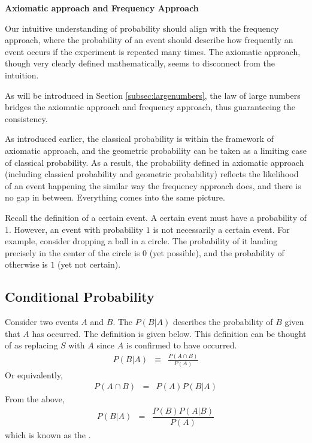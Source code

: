 \begin{mdframed}
\noindent \textbf{Axiomatic approach and Frequency Approach}

Our intuitive understanding of probability should align with the frequency approach, where the probability of an event should describe how frequently an event occurs if the experiment is repeated many times. The axiomatic approach, though very clearly defined mathematically, seems to disconnect from the intuition.

As will be introduced in Section \ref{subsec:largenumbers}, the law of large numbers bridges the axiomatic approach and frequency approach, thus guaranteeing the consistency. 

As introduced earlier, the classical probability is within the framework of axiomatic approach, and the geometric probability can be taken as a limiting case of classical probability. As a result, the probability defined in axiomatic approach (including classical probability and geometric probability) reflects the likelihood of an event happening the similar way the frequency approach does, and there is no gap in between. Everything comes into the same picture.

\end{mdframed}

Recall the definition of a certain event. A certain event must have a probability of $1$. However, an event with probability $1$ is not necessarily a certain event. For example, consider dropping a ball in a circle. The probability of it landing precisely in the center of the circle is $0$ (yet possible), and the probability of otherwise is $1$ (yet not certain).

\subsection{Conditional Probability}

Consider two events $A$ and $B$. The  $P(B|A)$ describes the probability of $B$ given that $A$ has occurred. The definition is given below. This definition can be thought of as replacing $S$ with $A$ since $A$ is confirmed to have occurred.
\begin{eqnarray}
  P(B|A) &\equiv& \frac{P(A\cap B)}{P(A)} \nonumber
\end{eqnarray}
Or equivalently,
\begin{eqnarray}
  P(A\cap B) &=& P(A)P(B|A) \nonumber
\end{eqnarray}
From the above,
\begin{eqnarray}
  P(B|A) &=& \dfrac{P(B)P(A|B)}{P(A)} \nonumber
\end{eqnarray}
which is known as the .

